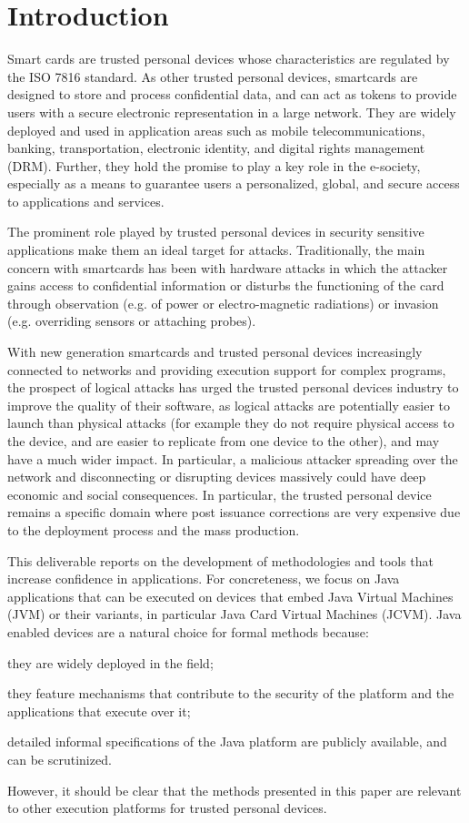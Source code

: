 \chapter{Introduction}


Smart cards are trusted personal devices whose characteristics are
regulated by the ISO 7816 standard. As other trusted personal devices,
smartcards are designed to store and process confidential data, and
can act as tokens to provide users with a secure electronic
representation in a large network. They are widely deployed and used
in application areas such as mobile telecommunications, banking,
transportation, electronic identity, and digital rights management
(DRM). Further, they hold the promise to play a key role in the
e-society, especially as a means to guarantee users a personalized,
global, and secure access to applications and services.


The prominent role played by trusted personal devices in security
sensitive applications make them an ideal target for
attacks. Traditionally, the main concern with smartcards has been with
hardware attacks in which the attacker gains access to confidential
information or disturbs the functioning of the card through
observation (e.g. of power or electro-magnetic radiations) or invasion
(e.g. overriding sensors or attaching probes).


With new generation smartcards and trusted personal devices
increasingly connected to networks and providing execution support for
complex programs, the prospect of logical attacks has urged the
trusted personal devices industry to improve the quality of their
software, as logical attacks are potentially easier to launch than
physical attacks (for example they do not require physical access to
the device, and are easier to replicate from one device to the other),
and may have a much wider impact. In particular, a malicious attacker
spreading over the network and disconnecting or disrupting devices
massively could have deep economic and social consequences. In
particular, the trusted personal device remains a specific domain
where post issuance corrections are very expensive due to the
deployment process and the mass production.

This deliverable reports on the development of methodologies and tools
that increase confidence in applications.  For concreteness, we focus 
on Java applications that can be executed on devices that embed Java
Virtual Machines (JVM) or their variants, in particular Java Card
Virtual Machines (JCVM). Java enabled devices are a natural choice for
formal methods because:
\begin{inparaenum}[i)]
\item they are widely deployed in the field;
\item they feature mechanisms that contribute to the security of the
platform and the applications that execute over it;
\item detailed informal specifications of the Java platform are publicly
available, and can be scrutinized.
\end{inparaenum}
However, it should be clear that the methods presented in this paper
are relevant to other execution platforms for trusted personal devices.




